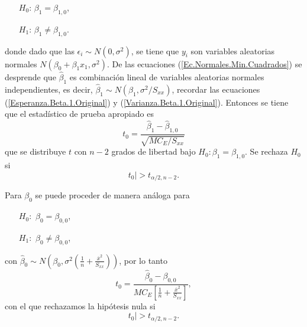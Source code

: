 \documentclass[a4paper]{report} %
\begin{document}
\begin{center}
\begin{itemize}
\item[$H_{0}$: ] $\beta_{1}=\beta_{1,0}$,
\item[$H_{1}$: ]$\beta_{1}\neq\beta_{1,0}$.
\end{itemize}
\end{center}

donde dado que las $\epsilon_{i} \sim N\left(0,\sigma^{2}\right)$, se tiene que $y_{i}$ son variables aleatorias normales $N\left(\beta_{0}+\beta_{1}x_{1},\sigma^{2}\right)$. De las ecuaciones (\ref{Ec.Normales.Min.Cuadrados}) se desprende que $\hat{\beta}_{1}$ es combinaci\'on lineal de variables aleatorias normales independientes, es decir, $\hat{\beta}_{1}\sim N\left(\beta_{1},\sigma^{2}/S_{xx}\right)$, recordar las ecuaciones (\ref{Esperanza.Beta.1.Original}) y (\ref{Varianza.Beta.1.Original}).
Entonces se tiene que el estad\'istico de prueba apropiado es
\begin{equation}\label{Estadistico.Beta.1.Original}
t_{0}=\frac{\hat{\beta}_{1}-\hat{\beta}_{1,0}}{\sqrt{MC_{E}/S_{xx}}}
\end{equation}
que se distribuye $t$ con $n-2$ grados de libertad bajo $H_{0}:\beta_{1}=\beta_{1,0}$. Se rechaza $H_{0}$ si 
\begin{equation}\label{Zona.Rechazo.Beta.1}
t_{0}|>t_{\alpha/2,n-2}.
\end{equation}

Para $\beta_{0}$ se puede proceder de manera an\'aloga para
\begin{itemize}
\item[$H_{0}:$] $\beta_{0}=\beta_{0,0}$,
\item[$H_{1}:$] $\beta_{0}\neq\beta_{0,0}$,
\end{itemize}
con $\hat{\beta}_{0}\sim N\left(\beta_{0},\sigma^{2}\left(\frac{1}{n}+\frac{\overline{x}^{2}}{S_{xx}}\right)\right)$, por lo tanto
\begin{equation}\label{Estadistico.Beta.0.Original}
t_{0}=\frac{\hat{\beta}_{0}-\beta_{0,0}}{MC_{E}\left[\frac{1}{n}+\frac{\overline{x}^{2}}{S_{xx}}\right]},
\end{equation}
con el que rechazamos la hip\'otesis nula si
\begin{equation}\label{Zona.Rechazo.Beta.0.Original}
t_{0}|>t_{\alpha/2,n-2}.
\end{equation}
\end{document}
